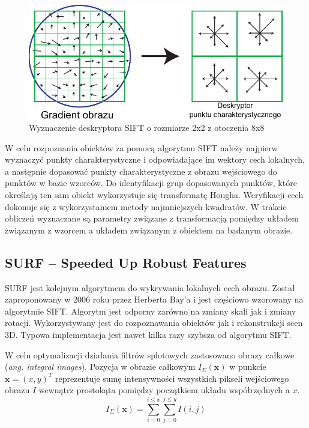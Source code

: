 \begin{figure}[h]
	\centering
	\includegraphics[scale=1]{graphics/01_podstawy_teoretyczne/sift-descriptor.pdf}
	\caption{Wyznaczenie deskryptora SIFT o rozmiarze 2x2 z otoczenia 8x8 \cite{LOWE04}}
	\label{fig:sift-descriptor}
\end{figure}

W celu rozpoznania obiektów za pomocą algorytmu SIFT należy najpierw wyznaczyć punkty charakterystyczne i odpowiadające im wektory cech lokalnych, a następnie dopasować punkty charakterystyczne z obrazu wejściowego do punktów w bazie wzorców. Do identyfikacji grup dopasowanych punktów, które określają ten sam obiekt wykorzystuje się transformatę Hougha. Weryfikacji cech dokonuje się z wykorzystaniem metody najmniejszych kwadratów. W trakcie obliczeń wyznaczane są parametry związane z transformacją pomiędzy układem związanym z wzorcem a układem związanym z obiektem na badanym obrazie.

\subsection{SURF -- Speeded Up Robust Features}

SURF jest kolejnym algorytmem do wykrywania lokalnych cech obrazu. Został zaproponowany w 2006 roku przez Herberta Bay'a i jest częściowo wzorowany na algorytmie SIFT.\cite{BAY08} Algorytm jest odporny zarówno na zmiany skali jak i zmiany rotacji. Wykorzystywany jest do rozpoznawania obiektów jak i rekonstrukcji scen 3D. Typowa implementacja jest nawet kilka razy szybsza od algorytmu SIFT.\cite{SCHWEIGER09}

W celu optymalizacji działania filtrów splotowych zastosowano obrazy całkowe (\emph{ang. integral images}). Pozycja w obrazie całkowym $I_{\Sigma}(\boldsymbol{x})$ w punkcie $\boldsymbol{x}=(x, y)^T$ reprezentuje sumę intensywności wszystkich pikseli wejściowego obrazu $I$ wewnątrz prostokąta pomiędzy początkiem układu współrzędnych a $x$.
\begin{equation} 
\label{surf_integral_image} 
I_{\Sigma}(\boldsymbol{x}) = \sum\limits_{i=0}^{i \leq x} \sum\limits_{j=0}^{j \leq y} I(i,j)
\end{equation}

